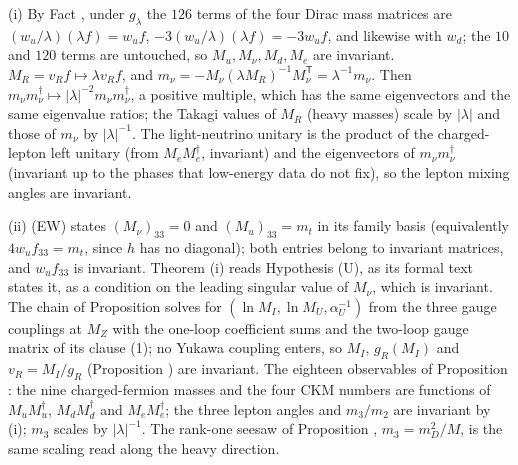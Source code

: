 (i) By Fact , under $g_{\lambda}$ the $126$ terms of the four Dirac mass matrices are $(w_{u}/\lambda)(\lambda f) = w_{u}f$, $-3(w_{u}/\lambda)(\lambda f) = -3w_{u}f$, and likewise with $w_{d}$; the $10$ and $120$ terms are untouched, so $M_{u}, M_{\nu}, M_{d}, M_{e}$ are invariant. $M_{R} = v_{R}f \mapsto \lambda v_{R}f$, and $m_{\nu} = -M_{\nu}(\lambda M_{R})^{-1}M_{\nu}^{\mathsf{T}} = \lambda^{-1}m_{\nu}$. Then $m_{\nu}m_{\nu}^{\dagger} \mapsto |\lambda|^{-2}m_{\nu}m_{\nu}^{\dagger}$, a positive multiple, which has the same eigenvectors and the same eigenvalue ratios; the Takagi values of $M_{R}$ (heavy masses) scale by $|\lambda|$ and those of $m_{\nu}$ by $|\lambda|^{-1}$. The light-neutrino unitary is the product of the charged-lepton left unitary (from $M_{e}M_{e}^{\dagger}$, invariant) and the eigenvectors of $m_{\nu}m_{\nu}^{\dagger}$ (invariant up to the phases that low-energy data do not fix), so the lepton mixing angles are invariant.

(ii) (EW) states $(M_{\nu})_{33} = 0$ and $(M_{u})_{33} = m_{t}$ in its family basis (equivalently $4w_{u}f_{33} = m_{t}$, since $h$ has no diagonal); both entries belong to invariant matrices, and $w_{u}f_{33}$ is invariant. Theorem (i) reads Hypothesis (U), as its formal text states it, as a condition on the leading singular value of $M_{\nu}$, which is invariant. The chain of Proposition  solves for $(\ln M_{I}, \ln M_{U}, \alpha_{U}^{-1})$ from the three gauge couplings at $M_{Z}$ with the one-loop coefficient sums and the two-loop gauge matrix of its clause (1); no Yukawa coupling enters, so $M_{I}$, $g_{R}(M_{I})$ and $v_{R} = M_{I}/g_{R}$ (Proposition ) are invariant. The eighteen observables of Proposition : the nine charged-fermion masses and the four CKM numbers are functions of $M_{u}M_{u}^{\dagger}$, $M_{d}M_{d}^{\dagger}$ and $M_{e}M_{e}^{\dagger}$; the three lepton angles and $m_{3}/m_{2}$ are invariant by (i); $m_{3}$ scales by $|\lambda|^{-1}$. The rank-one seesaw of Proposition , $m_{3} = m_{D}^{2}/M$, is the same scaling read along the heavy direction.

